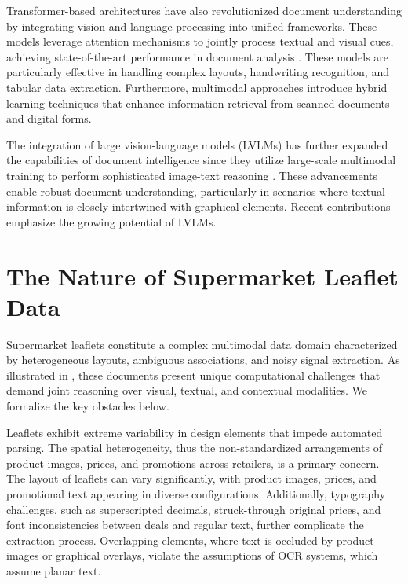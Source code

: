 \documentclass[11pt]{article}
\begin{document}
Transformer-based architectures \cite{vaswani2017, dosovitskiy2021} have also revolutionized document understanding by integrating vision and language processing into unified frameworks. These models leverage attention mechanisms to jointly process textual and visual cues, achieving state-of-the-art performance in document analysis \cite{kim2022,appalaraju2021}. These models are particularly effective in handling complex layouts, handwriting recognition, and tabular data extraction. Furthermore, multimodal approaches \cite{peng2022, li2021} introduce hybrid learning techniques that enhance information retrieval from scanned documents and digital forms.

The integration of large vision-language models (LVLMs) has further expanded the capabilities of document intelligence since they utilize large-scale multimodal training to perform sophisticated image-text reasoning \cite{touvron2023,qwen2025,dai2023}. These advancements enable robust document understanding, particularly in scenarios where textual information is closely intertwined with graphical elements. Recent contributions \cite{li2024, wei2024} emphasize the growing potential of LVLMs. 

\section{The Nature of Supermarket Leaflet Data}  
\label{sec:leaflets_data}
Supermarket leaflets constitute a complex multimodal data domain characterized by heterogeneous layouts, ambiguous associations, and noisy signal extraction. As illustrated in , these documents present unique computational challenges that demand joint reasoning over visual, textual, and contextual modalities. We formalize the key obstacles below.

Leaflets exhibit extreme variability in design elements that impede automated parsing. The spatial heterogeneity, thus the non-standardized arrangements of product images, prices, and promotions across retailers, is a primary concern. The layout of leaflets can vary significantly, with product images, prices, and promotional text appearing in diverse configurations. Additionally, typography challenges, such as superscripted decimals, struck-through original prices, and font inconsistencies between deals and regular text, further complicate the extraction process. Overlapping elements, where text is occluded by product images or graphical overlays, violate the assumptions of OCR systems, which assume planar text.
\end{document}
